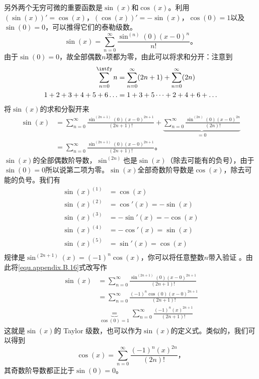 另外两个无穷可微的重要函数是$\sin(x)$和$\cos(x)$。利用$(\sin(x))'=\cos(x)$，$(\cos(x))'=-\sin(x)$，$\cos(0)=1$以及$\sin(0)=0$，可以推得它们的泰勒级数。
\begin{equation*}
\sin(x) = \sum\limits_{n=0}^\infty \frac{\sin^{(n)}(0)(x-0)^n}{n!}\text{。}
\end{equation*}
由于$\sin(0)=0$，故全部偶数$n$项都为零，由此可以将求和分开：注意到
\begin{equation}
\begin{aligned}
\sum\limits_{n=0}^{\intfy}n &= \sum\limits_{n=0}^\infty (2n+1) + \sum\limits_{n=0}^\infty (2n) \\
1+2+3+4+5+6\dots &= 1+3+5\dots + 2+4+6+\dots
\end{aligned}
\end{equation}
将$\sin(x)$的求和分裂开来
\begin{equation}
\begin{aligned}
\sin(x) &= \sum\limits_{n=0}^\infty \frac{\sin^{(2n+1)}(0)(x-0)^{2n+1}}{(2n+1)!}+ \underbrace{\sum\limits_{n=0}^\infty \frac{\sin^{(2n)}(0)(x-0)^{2n}}{(2n)!}}_{=0} \\
 &= \sum\limits_{n=0}^\infty \frac{\sin^{(2n+1)}(0)(x-0)^{2n+1}}{(2n+1)!}\text{。}
\end{aligned}
\label{equ.appendix.B.16}
\end{equation}
$\sin(x)$的全部偶数阶导数，$\sin^{(2n)}$也是$\sin(x)$（除去可能有的负号），由于$\sin(0)=0$所以说第二项为零。$\sin(x)$全部奇数阶导数是$\cos(x)$，除去可能的负号。我们有
\begin{equation}
\begin{aligned}
\sin(x)^{(1)}&=\cos(x) \\
\sin(x)^{(2)}&=\cos'(x)=-\sin(x) \\
\sin(x)^{(3)}&=-\sin'(x)=-\cos(x) \\
\sin(x)^{(4)}&=-\cos'(x)=\sin(x) \\
\sin(x)^{(5)}&=\sin'(x)=\cos(x) \\
\end{aligned}
\end{equation}
规律是$\sin^{(2n+1)}(x)=(-1)^n\cos(x)$，你可以将任意整数$n$带入验证%
%
。由此将\ref{equ.appendix.B.16}式改写作
\begin{equation}
\begin{aligned}
\sin(x) &= \sum\limits_{n=0}^{\infty}\frac{\sin^{(2n+1)}(0)(x-0)^{2n+1}}{(2n+1)!} \\
&= \sum\limits_{n=0}^{\infty}\frac{(-1)^n\cos(0)(x-0)^{2n+1}}{(2n+1)!} \\
&\underbrace{=}_{\cos(0)=1} \sum\limits_{n=0}^\infty \frac{(-1)^n(x)^{2n+1}}{(2n+1)!}
\end{aligned}
\label{equ.appendix.B.18}
\end{equation}
这就是$\sin(x)$的 Taylor 级数，也可以作为$\sin(x)$的定义式。类似的，我们可以得到
\begin{equation}
\cos(x)= \sum\limits_{n=0}^{\infty}\frac{(-1)^n(x)^{2n}}{(2n)!}\text{，}
\label{equ.appendix.B.19}
\end{equation}
其奇数阶导数都正比于$\sin(0)=0$。


